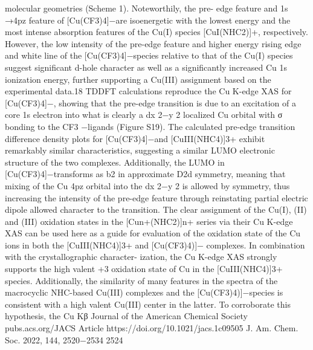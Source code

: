 \documentclass{article}
\begin{document}
molecular geometries (Scheme 1). Noteworthily, the pre-
edge feature and 1s →4pz feature of [Cu(CF3)4]−are
isoenergetic with the lowest energy and the most intense
absorption features of the Cu(I) species [CuI(NHC2)]+,
respectively. However, the low intensity of the pre-edge
feature and higher energy rising edge and white line of the
[Cu(CF3)4]−species relative to that of the Cu(I) species
suggest signiﬁcant d-hole character as well as a signiﬁcantly
increased Cu 1s ionization energy, further supporting a Cu(III)
assignment based on the experimental data.18
TDDFT calculations reproduce the Cu K-edge XAS for
[Cu(CF3)4]−, showing that the pre-edge transition is due to an
excitation of a core 1s electron into what is clearly a dx
2−y
2
localized Cu orbital with σ bonding to the CF3
−ligands
(Figure S19). The calculated pre-edge transition diﬀerence
density plots for [Cu(CF3)4]−and [CuIII(NHC4)]3+ exhibit
remarkably similar characteristics, suggesting a similar LUMO
electronic structure of the two complexes. Additionally, the
LUMO in [Cu(CF3)4]−transforms as b2 in approximate D2d
symmetry, meaning that mixing of the Cu 4pz orbital into the
dx
2−y
2 is allowed by symmetry, thus increasing the intensity of
the pre-edge feature through reinstating partial electric dipole
allowed character to the transition.
The clear assignment of the Cu(I), (II) and (III) oxidation
states in the [Cun+(NHC2)]n+ series via their Cu K-edge XAS
can be used here as a guide for evaluation of the oxidation state
of the Cu ions in both the [CuIII(NHC4)]3+ and [Cu(CF3)4)]−
complexes. In combination with the crystallographic character-
ization, the Cu K-edge XAS strongly supports the high valent
+3 oxidation state of Cu in the [CuIII(NHC4)]3+ species.
Additionally, the similarity of many features in the spectra of
the macrocyclic NHC-based Cu(III) complexes and the
[Cu(CF3)4)]−species is consistent with a high valent Cu(III)
center in the latter. To corroborate this hypothesis, the Cu Kβ
Journal of the American Chemical Society
pubs.acs.org/JACS
Article
https://doi.org/10.1021/jacs.1c09505
J. Am. Chem. Soc. 2022, 144, 2520−2534
2524

\newpage

\end{document}
